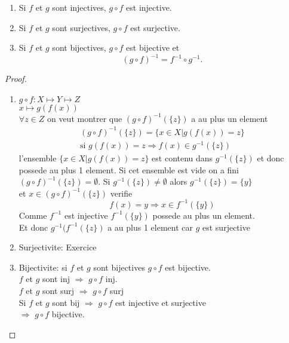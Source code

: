 \documentclass[../main.tex]{subfiles}
\begin{document}
\begin{lemma}\label{lemma:composition_d_applications_surjectives_et_injectives}
\begin{enumerate}
	\item Si $f$ et $g$ sont injectives, $g\circ f$ est injective.\\
	\item Si $f$ et $g$ sont surjectives, $g\circ f$ est surjective.\\
	\item Si $f$ et $g$ sont bijectives, $g\circ f$ est bijective et
		\[ 
			( g \circ f)^{-1} = f^{-1} \circ g^{-1}.
		\]
		
\end{enumerate}
\end{lemma}
\begin{proof}
\begin{enumerate}
	\item $g \circ f : X \mapsto Y \mapsto Z$ \\
		$x \mapsto g(f(x))$ \\
		$\forall z \in Z$ on veut montrer que $ ( g\circ f)^{-1} ( \{z\})$ a au plus un element
		\begin{align*}
			( g \circ f)^{-1}(\{z\}) = \{x \in X \vert g(f(x)) = z\}\\
			\text{si } g(f(x)) = z \Rightarrow f(x) \in g^{-1}(\{z\})
		\end{align*}
		l'ensemble $\{x \in X \vert g(f(x)) = z\}$ est contenu dans $g^{-1}(\{z\})$ et donc possede au plus 1 element.
		Si cet ensemble est vide on a fini $ ( g \circ f)^{-1} ( \{z\}) = \emptyset$.
		Si $g^{-1}(\{z\}) \neq \emptyset$ alors $g^{-1} ( \{z\}) = \{y\}$\\
		et $x \in ( g\circ f)^{-1} ( \{z\})$ verifie
		\[ 
			f(x) = y \Rightarrow x \in f^{-1}(\{y\})
		\]
		Comme $f^{-1}$ est injective $f^{-1}(\{y\})$ possede au plus un element.\\
		Et donc $g^{-1}(f^{-1}(\{z\})$ a au plus 1 element car $g$ est surjective\\
	\item Surjectivite: Exercice\\
	\item Bijectivite: si $f$ et $g$ sont bijectives $g\circ f$ est bijective.\\
		$f$ et $g$ sont inj $\Rightarrow$  $g\circ f$ inj.\\
		$f$ et $g$ sont surj $\Rightarrow$ $g\circ f$ surj\\
		Si $f$ et $g$ sont bij $\Rightarrow$ $g\circ f$ est injective et surjective\\
		$\Rightarrow$  $g \circ f$ bijective.
\end{enumerate}

\end{proof}
\end{document}
